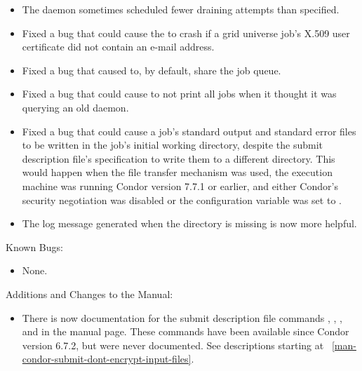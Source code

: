 \begin{itemize}
\item The  daemon sometimes scheduled fewer draining attempts 
than specified.

\item Fixed a bug that could cause the  to crash if a
grid universe job's X.509 user certificate did not contain an e-mail
address.

\item Fixed a bug that caused  to, by default, share the job queue.

\item Fixed a bug that could cause  to not print all jobs when
it thought it was querying an old  daemon.

\item Fixed a bug that could cause a job's standard output and standard
error files to be written in the job's initial working directory,
despite the submit description file's specification to write them 
to a different directory.
This would happen when the file transfer mechanism was used, 
the execution machine was running Condor version 7.7.1 or earlier, 
and either Condor's security negotiation
was disabled or the configuration variable
 was set to .

\item The log message generated when the  directory
is missing is now more helpful.

\end{itemize}

\noindent Known Bugs:

\begin{itemize}

\item None.

\end{itemize}

\noindent Additions and Changes to the Manual:

\begin{itemize}

\item There is now documentation for the submit description file commands
,
,
, and
 in the 
manual page.
These commands have been available since Condor version 6.7.2,
but were never documented.
See descriptions starting at
~\ref{man-condor-submit-dont-encrypt-input-files}.


\end{itemize}


